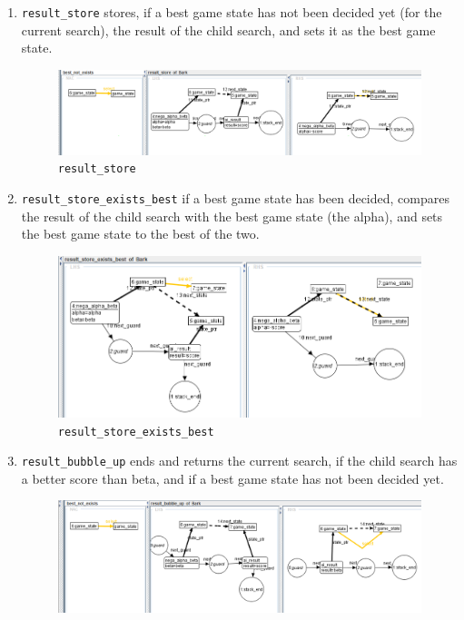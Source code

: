 \documentclass[a4paper, 10pt]{scrartcl}
\begin{document}
    \begin{enumerate}
        \item \texttt{result\_store} stores, if a best game state has not been decided yet (for the current search), the result of the child search, and sets it as the best game state.
        \begin{figure}[H]
            \centering
            \includegraphics[width=.8\linewidth]{images/result_store.png}
            \caption{\texttt{result\_store}}
        \end{figure}
        \item \texttt{result\_store\_exists\_best} if a best game state has been decided, compares the result of the child search with the best game state (the alpha), and sets the best game state to the best of the two.
        \begin{figure}[H]
            \centering
            \includegraphics[width=.8\linewidth]{images/result_store_exists_best.png}
            \caption{\texttt{result\_store\_exists\_best}}
        \end{figure}
        \item \texttt{result\_bubble\_up} ends and returns the current search, if the child search has a better score than beta, and if a best game state has not been decided yet.
        \begin{figure}[H]
            \centering
            \includegraphics[width=.8\linewidth]{images/result_bubble_up.png}

\end{figure}
\end{enumerate}
\end{document}
